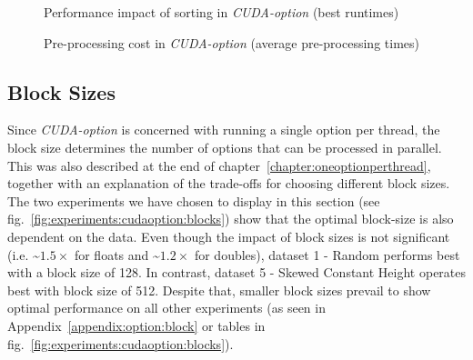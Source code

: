 \begin{figure}[H]
\begin{subfigure}{.49\textwidth}
\end{subfigure}
\begin{center}
  \small
\end{center}
\begin{center}
  \small
\end{center}
\caption{Performance impact of sorting in \textit{CUDA-option} (best runtimes)}
\label{fig:experiments:cudaoption:sorting}
\end{figure}

\begin{figure}[H]
\begin{center}
  \small
  \label{table:experiments:cudaoption:sortingcostfloats}
\end{center}
\begin{center}
  \small
  \label{table:experiments:cudaoption:sortingcostdoubles}
\end{center}
\caption{Pre-processing cost in \textit{CUDA-option} (average pre-processing times)}
\label{fig:experiments:cudaoption:sorting-prep}
\end{figure}

\subsection{Block Sizes}
Since \textit{CUDA-option} is concerned with running a single option per thread, the block size determines the number of options that can be processed in parallel. This was also described at the end of chapter~\ref{chapter:oneoptionperthread}, together with an explanation of the trade-offs for choosing different block sizes. The two experiments we have chosen to display in this section (see fig.~\ref{fig:experiments:cudaoption:blocks}) show that the optimal block-size is also dependent on the data. Even though the impact of block sizes is not significant (i.e. \textasciitilde$1.5\times$ for floats and \textasciitilde$1.2\times$ for doubles), dataset 1 - Random performs best with a block size of 128. In contrast, dataset 5 - Skewed Constant Height operates best with block size of 512. Despite that, smaller block sizes prevail to show optimal performance on all other experiments (as seen in Appendix~\ref{appendix:option:block} or tables in fig.~\ref{fig:experiments:cudaoption:blocks}).

